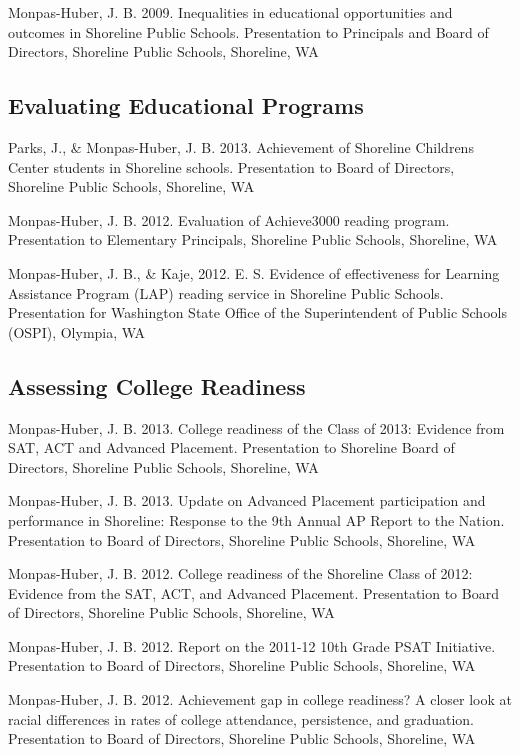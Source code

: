 \documentclass[
  letterpaper,
]{article}
\begin{document}
Monpas-Huber, J. B. 2009. Inequalities in educational opportunities and
outcomes in Shoreline Public Schools. Presentation to Principals and
Board of Directors, Shoreline Public Schools, Shoreline, WA

\subsection{Evaluating Educational
Programs}\label{evaluating-educational-programs}

Parks, J., \& Monpas-Huber, J. B. 2013. Achievement of Shoreline
Childrens Center students in Shoreline schools. Presentation to Board of
Directors, Shoreline Public Schools, Shoreline, WA

Monpas-Huber, J. B. 2012. Evaluation of Achieve3000 reading program.
Presentation to Elementary Principals, Shoreline Public Schools,
Shoreline, WA

Monpas-Huber, J. B., \& Kaje, 2012. E. S. Evidence of effectiveness for
Learning Assistance Program (LAP) reading service in Shoreline Public
Schools. Presentation for Washington State Office of the Superintendent
of Public Schools (OSPI), Olympia, WA

\subsection{Assessing College
Readiness}\label{assessing-college-readiness}

Monpas-Huber, J. B. 2013. College readiness of the Class of 2013:
Evidence from SAT, ACT and Advanced Placement. Presentation to Shoreline
Board of Directors, Shoreline Public Schools, Shoreline, WA

Monpas-Huber, J. B. 2013. Update on Advanced Placement participation and
performance in Shoreline: Response to the 9th Annual AP Report to the
Nation. Presentation to Board of Directors, Shoreline Public Schools,
Shoreline, WA

Monpas-Huber, J. B. 2012. College readiness of the Shoreline Class of
2012: Evidence from the SAT, ACT, and Advanced Placement. Presentation
to Board of Directors, Shoreline Public Schools, Shoreline, WA

Monpas-Huber, J. B. 2012. Report on the 2011-12 10th Grade PSAT
Initiative. Presentation to Board of Directors, Shoreline Public
Schools, Shoreline, WA

Monpas-Huber, J. B. 2012. Achievement gap in college readiness? A closer
look at racial differences in rates of college attendance, persistence,
and graduation. Presentation to Board of Directors, Shoreline Public
Schools, Shoreline, WA
\end{document}
